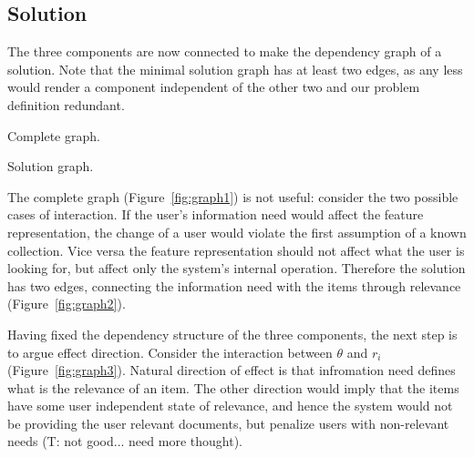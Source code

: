 \documentclass[10pt]{tufte-handout}
\begin{document}
\subsection{Solution}
The three components are now connected to make the dependency graph of a solution. Note that the minimal solution graph has at least two edges, as any less would render a component independent of the other two and our problem definition redundant.

\begin{marginfigure}%
\caption{Complete graph.}
\label{fig:graph1}
\end{marginfigure}

\begin{marginfigure}%
\caption{Solution graph.}
\label{fig:graph2}
\end{marginfigure}

The complete graph (Figure~\ref{fig:graph1}) is not useful: consider
the two possible cases of interaction. If the user's information need would
affect the feature representation, the change of a user would violate
the first assumption of a known collection. Vice versa the feature
representation should not affect what the user is looking for, but
affect only the system's internal operation. Therefore the solution
has two edges, connecting the information need with the items through
relevance (Figure~\ref{fig:graph2}).

Having fixed the dependency structure of the three components, the
next step is to argue effect direction. Consider the interaction between $\theta$ and $r_i$ (Figure~\ref{fig:graph3}). Natural direction of effect is that infromation need defines what is the relevance of an item. The other direction would imply that the items have some user independent state of relevance, and hence the system would not be providing the user relevant documents, but penalize users with non-relevant needs (T: not good... need more thought).
\end{document}
